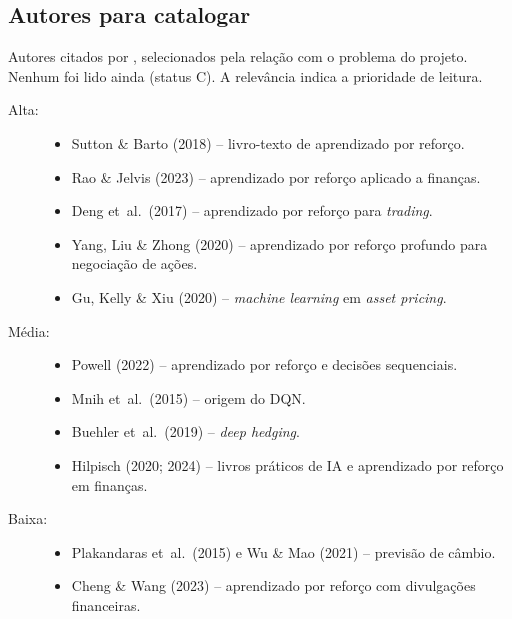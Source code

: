 \subsection*{Autores para catalogar}

Autores citados por \textcite{silva2026ia}, selecionados pela relação com o problema do projeto. Nenhum foi lido ainda (status C). A relevância indica a prioridade de leitura.

\begin{description}
  \item[Alta:] \hfill
  \begin{itemize}
    \item Sutton \& Barto (2018) -- livro-texto de aprendizado por reforço.
    \item Rao \& Jelvis (2023) -- aprendizado por reforço aplicado a finanças.
    \item Deng et~al.~(2017) -- aprendizado por reforço para \emph{trading}.
    \item Yang, Liu \& Zhong (2020) -- aprendizado por reforço profundo para negociação de ações.
    \item Gu, Kelly \& Xiu (2020) -- \emph{machine learning} em \emph{asset pricing}.
  \end{itemize}
  \item[Média:] \hfill
  \begin{itemize}
    \item Powell (2022) -- aprendizado por reforço e decisões sequenciais.
    \item Mnih et~al.~(2015) -- origem do DQN.
    \item Buehler et~al.~(2019) -- \emph{deep hedging}.
    \item Hilpisch (2020; 2024) -- livros práticos de IA e aprendizado por reforço em finanças.
  \end{itemize}
  \item[Baixa:] \hfill
  \begin{itemize}
    \item Plakandaras et~al.~(2015) e Wu \& Mao (2021) -- previsão de câmbio.
    \item Cheng \& Wang (2023) -- aprendizado por reforço com divulgações financeiras.
  \end{itemize}
\end{description}